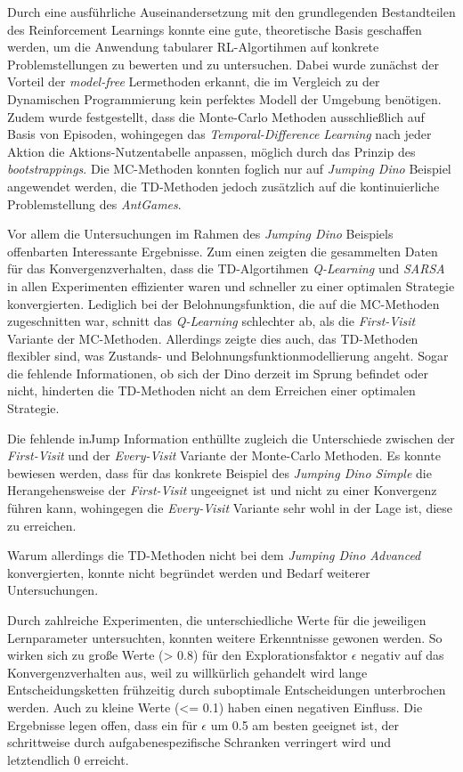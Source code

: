 Durch eine ausführliche Auseinandersetzung mit den grundlegenden Bestandteilen des Reinforcement Learnings konnte eine gute, theoretische Basis geschaffen werden, um die Anwendung tabularer RL-Algortihmen auf konkrete Problemstellungen zu bewerten und zu untersuchen. Dabei wurde zunächst der Vorteil der \textit{model-free} Lermethoden erkannt, die im Vergleich zu der Dynamischen Programmierung kein perfektes Modell der Umgebung benötigen.
Zudem wurde festgestellt, dass die Monte-Carlo Methoden ausschließlich  auf Basis von Episoden, wohingegen das \textit{Temporal-Difference Learning} nach jeder Aktion die Aktions-Nutzentabelle anpassen, möglich durch das Prinzip des \textit{bootstrappings}. Die MC-Methoden konnten foglich nur auf \textit{Jumping Dino} Beispiel angewendet werden, die TD-Methoden jedoch zusätzlich auf die kontinuierliche Problemstellung des \textit{AntGames}.
\par 
Vor allem die Untersuchungen im Rahmen des \textit{Jumping Dino} Beispiels offenbarten Interessante Ergebnisse. Zum einen zeigten die gesammelten Daten für das Konvergenzverhalten, dass die TD-Algortihmen \textit{Q-Learning} und \textit{SARSA} in allen Experimenten effizienter waren und schneller zu einer optimalen Strategie konvergierten. Lediglich bei der Belohnungsfunktion, die auf die MC-Methoden zugeschnitten war, schnitt das \textit{Q-Learning} schlechter ab, als die \textit{First-Visit} Variante der MC-Methoden. Allerdings zeigte dies auch, das TD-Methoden flexibler sind, was Zustands- und Belohnungsfunktionmodellierung angeht. Sogar die fehlende Informationen, ob sich der Dino derzeit im Sprung befindet oder nicht, hinderten die TD-Methoden nicht an dem Erreichen einer optimalen Strategie. 
\par 
Die fehlende \glqq inJump\grqq{} Information enthüllte zugleich die Unterschiede zwischen der \textit{First-Visit} und der \textit{Every-Visit} Variante der Monte-Carlo Methoden. Es konnte bewiesen werden, dass für das konkrete Beispiel des \textit{Jumping Dino Simple} die Herangehensweise der \textit{First-Visit} ungeeignet ist und nicht zu einer Konvergenz führen kann, wohingegen die \textit{Every-Visit} Variante sehr wohl in der Lage ist, diese zu erreichen.
\par 
Warum allerdings die TD-Methoden nicht bei dem \textit{Jumping Dino Advanced} konvergierten, konnte nicht begründet werden und Bedarf weiterer Untersuchungen.
\par 
Durch zahlreiche Experimenten, die unterschiedliche Werte für die jeweiligen Lernparameter untersuchten, konnten weitere Erkenntnisse gewonen werden. So wirken sich zu große Werte (> 0.8) für den Explorationsfaktor $\epsilon$ negativ auf das Konvergenzverhalten aus, weil zu willkürlich gehandelt wird lange Entscheidungsketten frühzeitig durch suboptimale Entscheidungen unterbrochen werden. Auch zu kleine Werte (<= 0.1) haben einen negativen Einfluss. Die Ergebnisse legen offen, dass ein für $\epsilon$ um 0.5 am besten geeignet ist, der schrittweise durch aufgabenespezifische Schranken verringert wird und letztendlich 0 erreicht.
